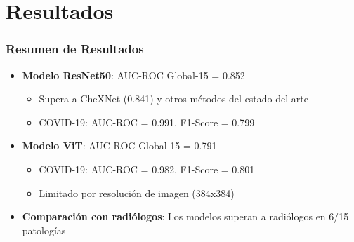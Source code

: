 
\section{Resultados}

\begin{frame}
\frametitle{Resumen de Resultados}
\begin{itemize}
    \item \textbf{Modelo ResNet50}: AUC-ROC Global-15 = 0.852
    \begin{itemize}
        \item Supera a CheXNet (0.841) y otros métodos del estado del arte
        \item COVID-19: AUC-ROC = 0.991, F1-Score = 0.799
    \end{itemize}
    \item \textbf{Modelo ViT}: AUC-ROC Global-15 = 0.791
    \begin{itemize}
        \item COVID-19: AUC-ROC = 0.982, F1-Score = 0.801
        \item Limitado por resolución de imagen (384x384)
    \end{itemize}
    \item \textbf{Comparación con radiólogos}: Los modelos superan a radiólogos en 6/15 patologías
\end{itemize}
\end{frame}

